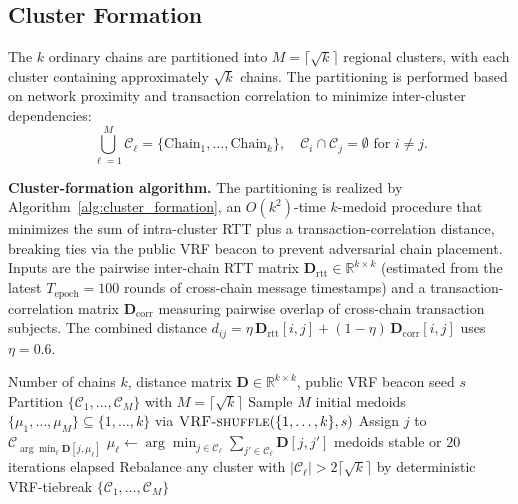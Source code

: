 \documentclass[journal]{IEEEtran}
\begin{document}
\subsection{Cluster Formation}

The $k$ ordinary chains are partitioned into $M = \lceil \sqrt{k} \rceil$ regional clusters, with each cluster containing approximately $\sqrt{k}$ chains. The partitioning is performed based on network proximity and transaction correlation to minimize inter-cluster dependencies:
\begin{equation}
\bigcup_{\ell=1}^{M} \mathcal{C}_\ell = \{\text{Chain}_1, \ldots, \text{Chain}_k\}, \quad \mathcal{C}_i \cap \mathcal{C}_j = \emptyset \text{ for } i \neq j.
\label{eq:partition}
\end{equation}

\textbf{Cluster-formation algorithm.} The partitioning is realized by Algorithm~\ref{alg:cluster_formation}, an $O(k^2)$-time $k$-medoid procedure that minimizes the sum of intra-cluster RTT plus a transaction-correlation distance, breaking ties via the public VRF beacon to prevent adversarial chain placement. Inputs are the pairwise inter-chain RTT matrix $\mathbf{D}_{\mathrm{rtt}}\in\mathbb{R}^{k\times k}$ (estimated from the latest $T_{\mathrm{epoch}}=100$ rounds of cross-chain message timestamps) and a transaction-correlation matrix $\mathbf{D}_{\mathrm{corr}}$ measuring pairwise overlap of cross-chain transaction subjects. The combined distance $d_{ij} = \eta\,\mathbf{D}_{\mathrm{rtt}}[i,j] + (1-\eta)\,\mathbf{D}_{\mathrm{corr}}[i,j]$ uses $\eta = 0.6$.

\begin{algorithm}[t]
\caption{Reputation-Aware Cluster Formation}
\label{alg:cluster_formation}
\begin{algorithmic}[1]
\Require Number of chains $k$, distance matrix $\mathbf{D}\in\mathbb{R}^{k\times k}$, public VRF beacon seed $s$
\Ensure Partition $\{\mathcal{C}_1,\ldots,\mathcal{C}_M\}$ with $M=\lceil\sqrt{k}\rceil$
\State Sample $M$ initial medoids $\{\mu_1,\ldots,\mu_M\}\subseteq\{1,\ldots,k\}$ via $\textsc{VRF-shuffle}(\{1,\ldots,k\},s)$
\Repeat
    \State Assign $j$ to $\mathcal{C}_{\arg\min_\ell \mathbf{D}[j,\mu_\ell]}$
  \EndFor
    \State $\mu_\ell \gets \arg\min_{j\in\mathcal{C}_\ell} \sum_{j'\in\mathcal{C}_\ell}\mathbf{D}[j,j']$
  \EndFor
\Until medoids stable or $20$ iterations elapsed
\State Rebalance any cluster with $|\mathcal{C}_\ell|>2\lceil\sqrt{k}\rceil$ by deterministic VRF-tiebreak
\State \Return $\{\mathcal{C}_1,\ldots,\mathcal{C}_M\}$
\end{algorithmic}
\end{algorithm}
\end{document}
